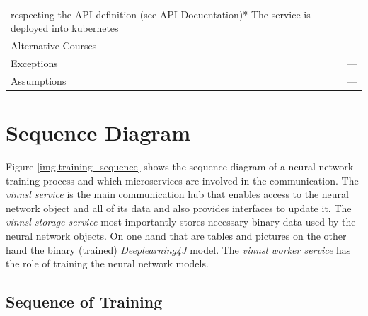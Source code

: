 \begin{longtable}[]{@{}ll@{}}
\begin{minipage}[t]{0.68\columnwidth}
respecting the API definition (see API Docuentation)* The service is
deployed into kubernetes\strut
\end{minipage}\tabularnewline
\begin{minipage}[t]{0.27\columnwidth}\raggedright\strut
Alternative Courses\strut
\end{minipage} & \begin{minipage}[t]{0.68\columnwidth}\raggedright\strut
---\strut
\end{minipage}\tabularnewline
\begin{minipage}[t]{0.27\columnwidth}\raggedright\strut
Exceptions\strut
\end{minipage} & \begin{minipage}[t]{0.68\columnwidth}\raggedright\strut
---\strut
\end{minipage}\tabularnewline
\begin{minipage}[t]{0.27\columnwidth}\raggedright\strut
Assumptions\strut
\end{minipage} & \begin{minipage}[t]{0.68\columnwidth}\raggedright\strut
---\strut
\end{minipage}\tabularnewline
\bottomrule
\end{longtable}

\section{Sequence Diagram}\label{sequence-diagram}

Figure \ref{img.training_sequence} shows the sequence diagram of a
neural network training process and which microservices are involved in
the communication. The \emph{vinnsl service} is the main communication
hub that enables access to the neural network object and all of its data
and also provides interfaces to update it. The \emph{vinnsl storage
service} most importantly stores necessary binary data used by the
neural network objects. On one hand that are tables and pictures on the
other hand the binary (trained) \emph{Deeplearning4J} model. The
\emph{vinnsl worker service} has the role of training the neural network
models.

\subsection{Sequence of Training}\label{sequence-of-training}

